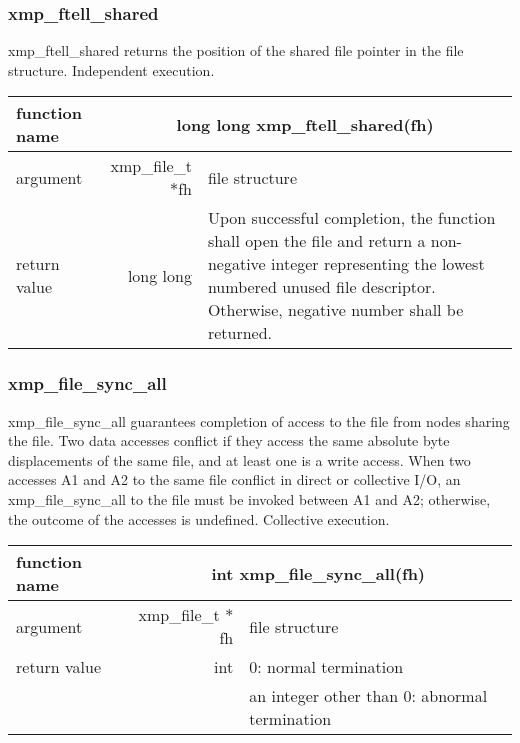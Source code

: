    \subsubsection{xmp\_ftell\_shared}
   xmp\_ftell\_shared returns the position of the shared file pointer in
   the file structure. Independent execution.

   \clearpage
   \begin{table}[h]
    \begin{center}
     \begin{tabular}{|l|r|p{80mm}|}
      \hline
      {\bf function name}  & \multicolumn{2}{c|}{\bf long long
      xmp\_ftell\_shared(fh)} \\ \hline \hline
      argument & xmp\_file\_t $*$fh & file structure \\ \hline
      return value & long long & Upon successful completion, the
	      function shall open the file and return a non-negative
	      integer representing the lowest numbered unused file
	      descriptor. Otherwise, negative number shall be
	      returned. \\ \hline
      \end{tabular}
     \end{center}
   \end{table}

   \subsubsection{xmp\_file\_sync\_all}
   xmp\_file\_sync\_all guarantees completion of access to the file from nodes sharing the file.
   Two data accesses conflict if they access the same absolute byte
   displacements of the same file, and at least one is a write access. 
   When two accesses A1 and A2 to the same file conflict in direct or
   collective I/O, an xmp\_file\_sync\_all to the file must be invoked
   between A1 and A2; otherwise, the outcome of the accesses is
   undefined.
   Collective execution.

   \begin{table}[h]
    \begin{center}
     \begin{tabular}{|l|r|p{80mm}|}
      \hline
      {\bf function name}  & \multicolumn{2}{c|}{\bf int
      xmp\_file\_sync\_all(fh)} \\ \hline \hline
      argument & xmp\_file\_t $*$fh & file structure \\ \hline
      return value & int & 0: normal termination \\
      &  & an integer other than 0: abnormal termination \\ \hline
      \end{tabular}
     \end{center}
   \end{table}

